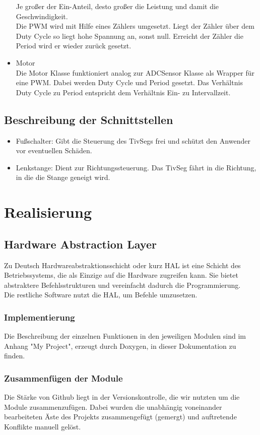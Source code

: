 \documentclass[a4paper,10pt,twoside]{report}
\begin{document}
\begin{itemize}
Je großer der Ein-Anteil, desto großer die Leistung und damit die Geschwindigkeit.\\
Die PWM wird mit Hilfe eines Zählers umgesetzt. Liegt der Zähler über dem Duty Cycle so liegt hohe Spannung an, sonst null. Erreicht der Zähler die Period wird er wieder zurück gesetzt.
\item Motor \\
Die Motor Klasse funktioniert analog zur ADCSensor Klasse als Wrapper für eine PWM.
Dabei werden Duty Cycle und Period gesetzt.
Das Verhältnis Duty Cycle zu Period entspricht dem Verhältnis Ein- zu Intervallzeit.

\end{itemize}

\newpage
\section{Beschreibung der Schnittstellen}
\begin{itemize}
\item Fußschalter:
Gibt die Steuerung des TivSegs frei und schützt den Anwender vor eventuellen Schäden.

\item Lenkstange:
Dient zur Richtungssteuerung.
Das TivSeg fährt in die Richtung, in die die Stange geneigt wird.
\end{itemize}


\chapter{Realisierung}
\section{Hardware Abstraction Layer}
Zu Deutsch Hardwareabstraktionsschicht oder kurz HAL ist eine Schicht des Betriebssystems, die als Einzige auf die Hardware zugreifen kann. Sie bietet abstraktere Befehlsstrukturen und vereinfacht dadurch die Programmierung.\\
Die restliche Software nutzt die HAL, um Befehle umzusetzen.

\subsection{Implementierung}
Die Beschreibung der einzelnen Funktionen in den jeweiligen Modulen sind im Anhang "My Project", erzeugt durch Doxygen, in dieser Dokumentation zu finden.
 
\subsection{Zusammenfügen der Module}
Die Stärke von Github liegt in der Versionskontrolle, die wir nutzten um die Module zusammenzufügen. Dabei wurden die unabhängig voneinander bearbeiteten Äste des Projekts zusammengefügt (gemergt) und auftretende Konflikte manuell gelöst.
\end{document}
